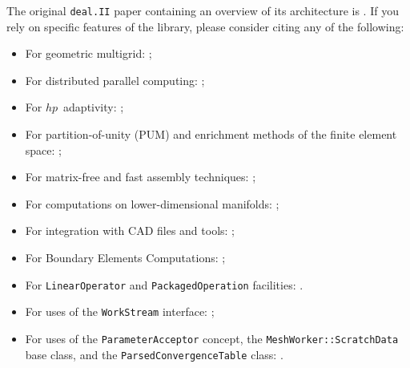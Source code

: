 \documentclass{ansarticle-preprint}
\newcommand{\specialword}[1]{\texttt{#1}}
\newcommand{\dealii}{{\specialword{deal.II}}\xspace}
\begin{document}
The original \texttt{\dealii} paper containing an overview of its
architecture is \cite{BangerthHartmannKanschat2007}. If you rely on
specific features of the library, please consider citing any of the
following:
\begin{itemize}
 \item For geometric multigrid: \cite{Kanschat2004,JanssenKanschat2011,ClevengerHeisterKanschatKronbichler2019};
 \item For distributed parallel computing: \cite{BangerthBursteddeHeisterKronbichler11};
 \item For $hp$~adaptivity: \cite{BangerthKayserHerold2007};
  \item For partition-of-unity (PUM) and enrichment methods of the
    finite element space: \cite{Davydov2016};
 \item For matrix-free and fast assembly techniques:
   \cite{KronbichlerKormann2012,KronbichlerKormann2019};
 \item For computations on lower-dimensional manifolds:
   \cite{DeSimoneHeltaiManigrasso2009};
 \item For integration with CAD files and tools:
   \cite{HeltaiMola2015};
 \item For Boundary Elements Computations:
   \cite{GiulianiMolaHeltai-2018-a};
 \item For \texttt{LinearOperator} and \texttt{PackagedOperation} facilities:
   \cite{MaierBardelloniHeltai-2016-a,MaierBardelloniHeltai-2016-b}.
 \item For uses of the \texttt{WorkStream} interface:
   \cite{TKB16};
   \item For uses of the \texttt{ParameterAcceptor} concept, the
     \texttt{MeshWorker::ScratchData} base class, and the
     \texttt{ParsedConvergenceTable} class: \cite{SartoriGiulianiBardelloni-2018-a}.
\end{itemize}
\end{document}
